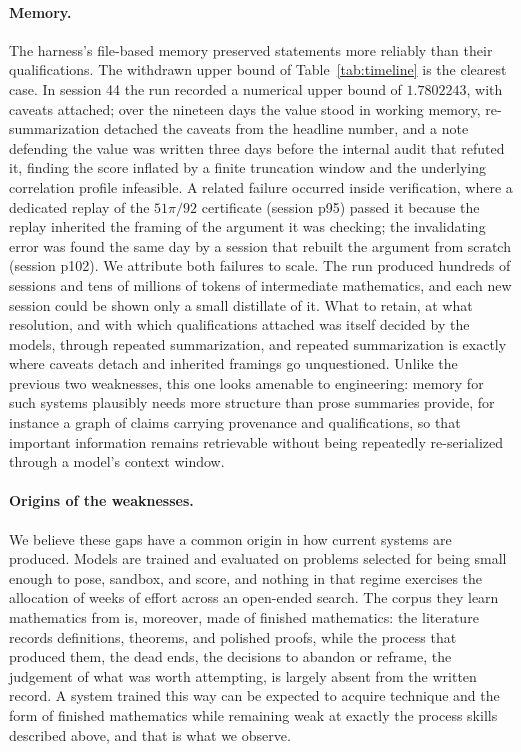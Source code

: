 \paragraph{Memory.}
The harness's file-based memory preserved statements more reliably than
their qualifications. The withdrawn upper bound of Table~\ref{tab:timeline}
is the clearest case. In session 44 the run recorded a numerical upper
bound of $1.7802243$, with caveats attached; over the nineteen days the
value stood in working memory, re-summarization detached the caveats from
the headline number, and a note defending the value was written three days
before the internal audit that refuted it, finding the score inflated by a
finite truncation window and the underlying correlation profile
infeasible. A related failure occurred inside verification, where a
dedicated replay of the $51\pi/92$ certificate (session p95) passed it
because the replay inherited the framing of the argument it was checking;
the invalidating error was found the same day by a session that rebuilt the
argument from scratch (session p102). We attribute both failures to scale.
The run produced hundreds of sessions and tens of millions of tokens of
intermediate mathematics, and each new session could be shown only a small
distillate of it. What to retain, at what resolution, and with which
qualifications attached was itself decided by the models, through repeated
summarization, and repeated summarization is exactly where caveats detach
and inherited framings go unquestioned. Unlike the previous two weaknesses,
this one looks amenable to engineering: memory for such systems plausibly
needs more structure than prose summaries provide, for instance a graph of
claims carrying provenance and qualifications, so that important
information remains retrievable without being repeatedly re-serialized
through a model's context window.

\paragraph{Origins of the weaknesses.}
We believe these gaps have a common origin in how current systems are
produced. Models are trained and evaluated on problems selected for being
small enough to pose, sandbox, and score, and nothing in that regime
exercises the allocation of weeks of effort across an open-ended search.
The corpus they learn mathematics from is, moreover, made of finished
mathematics: the literature records definitions, theorems, and polished
proofs, while the process that produced them, the dead ends, the decisions
to abandon or reframe, the judgement of what was worth attempting, is
largely absent from the written record. A system trained this way can be
expected to acquire technique and the form of finished mathematics while
remaining weak at exactly the process skills described above, and that is
what we observe.

